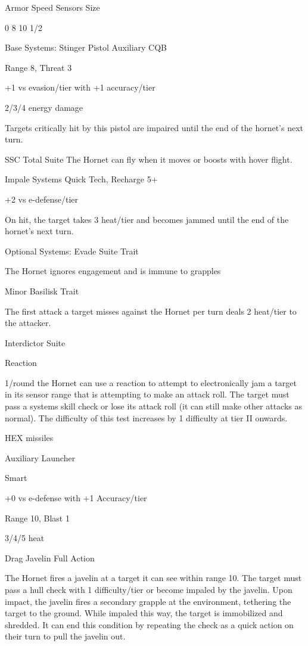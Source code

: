  Armor      Speed        Sensors       Size 

 0          8            10            1/2  

Base Systems:  
Stinger Pistol  
Auxiliary CQB
 
Range 8, Threat 3
 
+1 vs evasion/tier with +1 accuracy/tier
 
2/3/4 energy damage
 
Targets critically hit by this pistol are impaired until the end of the hornet’s next turn.
 

SSC Total Suite  
The Hornet can fly when it moves or boosts with hover flight.
 

Impale Systems  
Quick Tech, Recharge 5+
 
+2 vs e-defense/tier
 
On hit, the target takes 3 heat/tier and becomes jammed until the end of the hornet’s next turn.
 

Optional Systems:  
Evade Suite  
Trait
 
The Hornet ignores engagement and is immune to grapples
 

Minor Basilisk  
Trait
 
The first attack a target misses against the Hornet per turn deals 2 heat/tier to the attacker.
 

Interdictor Suite
 
Reaction
 

                                                                                                           


1/round the Hornet can use a reaction to attempt to electronically jam a target in its sensor range  
that is attempting to make an attack roll. The target must pass a systems skill check or lose its  
attack roll (it can still make other attacks as normal). The difficulty of this test increases by 1  
difficulty at tier II onwards.
 

HEX missiles
 
Auxiliary Launcher
 
Smart
 
+0 vs e-defense with +1 Accuracy/tier
 
Range 10, Blast 1
 
3/4/5 heat
 

Drag Javelin  
Full Action
 
The Hornet fires a javelin at a target it can see within range 10. The target must pass a hull check  
with 1 difficulty/tier or become impaled by the javelin. Upon impact, the javelin fires a secondary  
grapple at the environment, tethering the target to the ground. While impaled this way, the target  
is immobilized and shredded. It can end this condition by repeating the check as a quick action  
on their turn to pull the javelin out.
 

